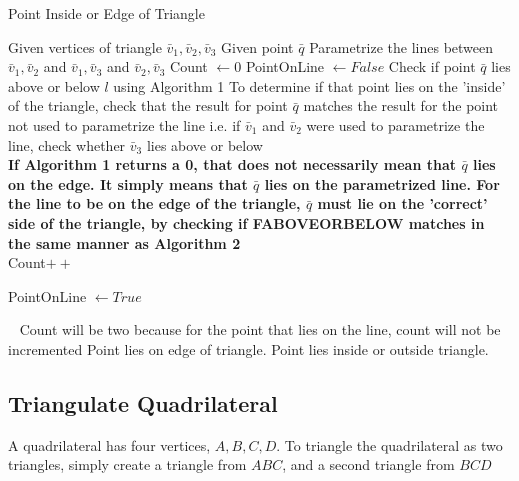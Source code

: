 \documentclass[a4paper,10pt]{scrartcl}
\begin{document}
\begin{algorithm}[!h]
  \caption{Point Inside or Edge of Triangle}\label{}
  \begin{algorithmic}
    \State Given vertices of triangle $\bar v_1, \bar v_2, \bar v_3$
    \State Given point $\bar q$
    \State Parametrize the lines between $\bar v_1, \bar v_2$ and $\bar v_1, \bar v_3$ and $\bar v_2, \bar v_3$
    \State Count $\gets 0$
    \State PointOnLine $\gets False$
      \State Check if point $\bar q$ lies above or below $l$ using Algorithm 1
      \State To determine if that point lies on the 'inside' of the triangle, check that the result
      for point $\bar q$ matches the result for the point not used to parametrize the line i.e. if
      $\bar v_1$ and $\bar v_2$ were used to parametrize the line, check whether $\bar v_3$ lies above or below
      \\
      {\bfseries
      \State If Algorithm 1 returns a 0, that does not necessarily mean that $\bar q$ lies on the edge. It simply means
      that $\bar q$ lies on the parametrized line. For the line to be on the edge of the triangle,
      $\bar q$ must lie on the 'correct' side of the triangle, by checking if FABOVEORBELOW matches in the same manner
      as Algorithm 2}
      \\
	\State Count$++$
      \EndIf
      
	\State PointOnLine $\gets True$
      \EndIf
    \EndFor
    
    \
      \Comment Count will be two because for the point that lies on the line, count will not be incremented
      \State Point lies on edge of triangle.
    \Else
      \State Point lies inside or outside triangle.
    \EndIf  
  \end{algorithmic}
\end{algorithm}

\newpage


\subsection{Triangulate Quadrilateral}

A quadrilateral has four vertices, $A, B, C, D$. To triangle the quadrilateral as two triangles, simply create
a triangle from $ABC$, and a second triangle from $BCD$
\end{document}
